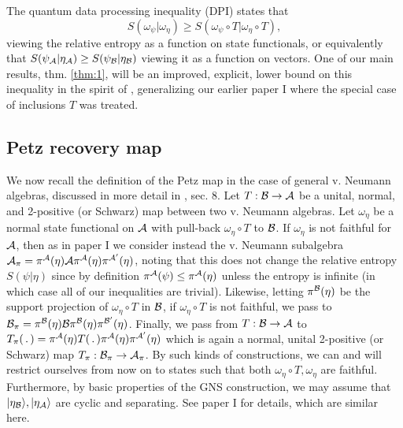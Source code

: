 \documentclass[english,a4paper,12pt]{article}
\def\cA{{\mathfrak A}}
\def\cB{{\mathfrak B}}
\newcommand{\ca}[1]{{\cal #1}}
\newcommand{\ben}{\begin{equation}}
\newcommand{\een}{\end{equation}}
\def\cA{{\ca A}}
\def\cB{{\ca B}}
\begin{document}
The quantum data processing inequality (DPI) \cite{Uhlmann1977} states that 
\ben
S(\omega_\psi | \omega_\eta) \ge S(\omega_\psi \circ T | \omega_\eta \circ T), 
\een
viewing the relative entropy as
a function on state functionals,
or equivalently that $S(\psi_\cA | \eta_\cA) \ge S(\psi_\cB | \eta_\cB)$ viewing it as a function on vectors. 
One of our main results, thm. \ref{thm:1}, will be an improved, explicit, lower bound on this inequality
in the spirit of \cite{Junge}, generalizing our earlier paper I where the special case of inclusions $T$ was treated. 

\subsection{Petz recovery map}
\label{subsec:petz}

We now recall the definition of the Petz map in the case of general v. Neumann algebras, discussed in more detail in \cite{Petz1993}, sec. 8.
Let $T: \cB \to \cA$ be a unital, normal, and 2-positive (or Schwarz) map between two v. Neumann algebras. Let $\omega_\eta$ be a normal 
state functional on $\cA$ with pull-back $ \omega_\eta \circ T$ to $\cB$. If $\omega_\eta$ is not faithful for $\cA$, then as in paper I \cite{Faulkner:2020iou}
we consider instead the v. Neumann subalgebra $\cA_\pi = \pi^\cA(\eta) \cA \pi^\cA(\eta) \pi^{\cA'}(\eta)$, noting that this does not change 
the relative entropy $S(\psi | \eta)$ since by definition $\pi^\cA(\psi) \le \pi^\cA(\eta)$ unless the entropy is infinite (in which case all of our 
inequalities are trivial). Likewise, letting $\pi^\cB(\eta)$ be the support projection of $\omega_\eta \circ T$ in $\cB$, if $\omega_\eta \circ T$
is not faithful, we pass to $\cB_\pi = \pi^\cB(\eta) \cB \pi^\cB(\eta)\pi^{\cB'}(\eta)$. Finally, we pass from $T:\cB \to \cA$ to $T_\pi( \, . \, ) = \pi^\cA(\eta) T( \, . \, )
\pi^\cA(\eta)\pi^{\cA'}(\eta)$ which is again a normal, unital 2-positive (or Schwarz) map $T_\pi:  \cB_\pi \to \cA_\pi$. 
By such kinds of constructions, we can and will restrict ourselves from now on to states such that both $ \omega_\eta \circ T, \omega_\eta$ are faithful. Furthermore, by basic properties of the GNS construction, we may assume that $|\eta_\cB\rangle, |\eta_\cA\rangle$ are cyclic and separating. See paper I for details, which are similar here. 
\end{document}
